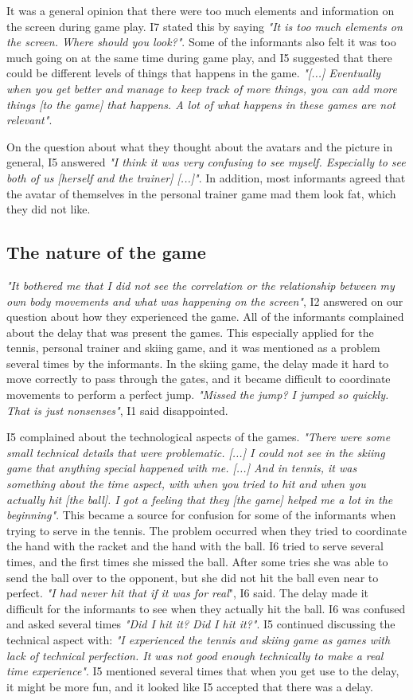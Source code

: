 It was a general opinion that there were too much elements and information on the screen during game play. I7 stated this by saying \emph{"It is too much elements on the screen. Where should you look?"}. Some of the informants also felt it was too much going on at the same time during game play, and I5 suggested that there could be different levels of things that happens in the game. \emph{"[...] Eventually when you get better and manage to keep track of more things, you can add more things [to the game] that happens. A lot of what happens in these games are not relevant"}. 

On the question about what they thought about the avatars and the picture in general, I5 answered \emph{"I think it was very confusing to see myself. Especially to see both of us [herself and the trainer] [...]"}. In addition, most informants agreed that the avatar of themselves in the personal trainer game mad them look fat, which they did not like. 

\subsection{The nature of the game}
\emph{"It bothered me that I did not see the correlation or the relationship between my own body movements and what was happening on the screen"}, I2 answered on our question about how they experienced the game. All of the informants complained about the delay that was present the games. This especially applied for the tennis, personal trainer and skiing game, and it was mentioned as a problem several times by the informants. In the skiing game, the delay made it hard to move correctly to pass through the gates, and it became difficult to coordinate movements to perform a perfect jump. \emph{"Missed the jump? I jumped so quickly. That is just nonsenses"}, I1 said disappointed.  

I5 complained about the technological aspects of the games. \emph{"There were some small technical details that were problematic. [...] I could not see in the skiing game that anything special happened with me. [...] And in tennis, it was something about the time aspect, with when you tried to hit and when you actually hit [the ball]. I got a feeling that they [the game] helped me a lot in the beginning"}. This became a source for confusion for some of the informants when trying to serve in the tennis. The problem occurred when they tried to coordinate the hand with the racket and the hand with the ball. I6 tried to serve several times, and the first times she missed the ball. After some tries she was able to send the ball over to the opponent, but she did not hit the ball even near to perfect. \emph{"I had never hit that if it was for real}", I6 said. The delay made it difficult for the informants to see when they actually hit the ball. I6 was confused and asked several times \emph{"Did I hit it? Did I hit it?"}. I5 continued discussing the technical aspect with: \emph{"I experienced the tennis and skiing game as games with lack of technical perfection. It was not good enough technically to make a real time experience"}. I5 mentioned several times that when you get use to the delay, it might be more fun, and it looked like I5 accepted that there was a delay. 

